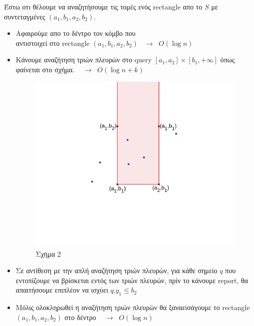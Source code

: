 \documentclass[12pt]{article}
\begin{document}
    Έστω οτι θέλουμε να αναζητήσουμε τις τομές ενός \textlatin{rectangle} απο το $S$ με συντεταγμένες $(a_1,b_1,a_2,b_2)$. 
    \begin{itemize}
        \item Αφαιρούμε απο το δέντρο τον κόμβο που\\ αντιστοιχεί στο   \textlatin{rectangle} $(a_1,b_1,a_2,b_2)\;\;\;\rightarrow \;\;O(\log n)$
        \item Κάνουμε αναζήτηση τριών πλευρών στο \textlatin{query} $[a_1,a_2]\times [b_1, +\infty ]$ όπως φαίνεται στο σχήμα. $\;\;\;\rightarrow \;\;O(\log n +k)$
        \begin{figure}[H]
            \centering
            \includegraphics[scale = 0.4]{geogebra-export3.png}
            \caption*{Σχήμα 2}
        \end{figure}
        \item Σε αντίθεση με την απλή αναζήτηση τριών πλευρών, για κάθε σημείο $q$ που εντοπίζουμε να βρίσκεται εντός των τριών πλευρών, πρίν το κάνουμε \textlatin{report}, θα απαιτήσουμε επιπλέον να ισχύει $q.y_1\leq b_2$ 
        \item Μόλις ολοκληρωθεί η αναζήτηση τριών πλευρών θα ξαναεισάγουμε το \textlatin{rectangle} $(a_1,b_1,a_2,b_2)$  στο δέντρο $\;\;\;\rightarrow \;\;O(\log n)$
    \end{itemize}
\end{document}
